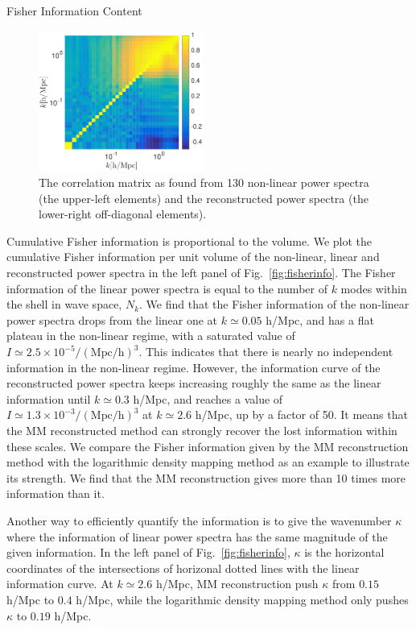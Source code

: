 \begin{section}{Fisher Information Content}
  \begin{figure}
    \centering
    \includegraphics[width=0.48\textwidth]{fig3.pdf}
    \caption{The correlation matrix as found from 130 non-linear power
      spectra (the upper-left elements) and the reconstructed power
      spectra (the lower-right off-diagonal elements).}
    \label{fig:corrall}
  \end{figure}

  Cumulative Fisher information is proportional to the volume. 
  We plot the cumulative Fisher information per unit volume of the
  non-linear, linear and reconstructed power spectra in the left panel of 
  Fig.~\ref{fig:fisherinfo}. The Fisher information of the linear 
  power spectra is equal to the number of $k$ modes within the shell in 
  wave space, $N_k$. We find that the Fisher information of the
  non-linear power spectra drops from the linear one at
  $k \simeq 0.05$ h/Mpc, and has a flat plateau in the non-linear
  regime, with a saturated value of
  $I \simeq 2.5 \times 10^{-5}/\mathrm{(Mpc/h)}^3$.  This indicates
  that there is nearly no independent information in the non-linear
  regime.  However, the information curve of the reconstructed power
  spectra keeps increasing roughly the same as the linear information
  until $k\simeq 0.3$ h/Mpc, and reaches a value of 
  $I \simeq 1.3 \times 10^{-3}/\mathrm{(Mpc/h)}^3$ at $k \simeq 2.6$ h/Mpc, up by a
  factor of 50.  
  It means that the MM reconstructed method can
  strongly recover the lost information within these scales.  
  We compare the Fisher information given by the MM reconstruction method
  with the logarithmic density mapping method \cite{bib:Mark2009} as
  an example to illustrate its strength. We find that the MM
  reconstruction gives more than 10 times more information than it.

  Another way to efficiently quantify the information is to give the wavenumber $\kappa$ 
  where the information of linear power spectra has the same magnitude of 
  the given information. In the left panel of Fig.~\ref{fig:fisherinfo}, 
  $\kappa$ is the horizontal coordinates of the intersections of horizonal 
  dotted lines with the linear information curve. At $k \simeq 2.6$ h/Mpc, MM reconstruction 
  push $\kappa$ from $0.15$ h/Mpc to $0.4$ h/Mpc, while the logarithmic density mapping method 
  only pushes $\kappa$ to $0.19$ h/Mpc.


\end{section}
